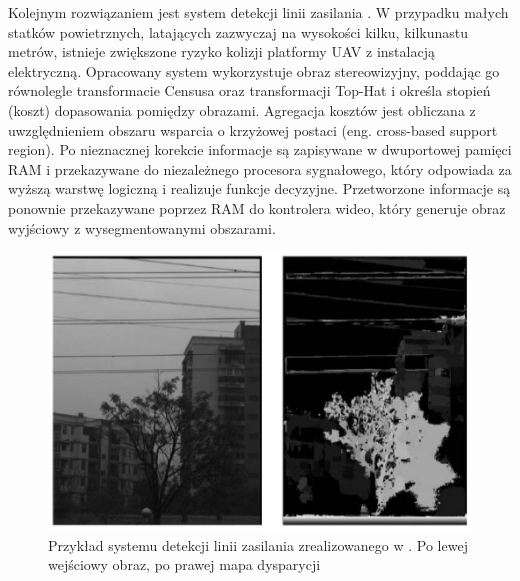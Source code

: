 Kolejnym rozwiązaniem jest system detekcji linii zasilania \cite{STEREOVISION3}. 
W przypadku małych statków powietrznych, latających zazwyczaj na wysokości kilku, kilkunastu metrów, istnieje zwiększone ryzyko kolizji platformy UAV z instalacją elektryczną. 
Opracowany system wykorzystuje obraz stereowizyjny, poddając go równolegle transformacie Censusa oraz transformacji Top-Hat i określa stopień (koszt) dopasowania pomiędzy obrazami. %
Agregacja kosztów jest obliczana z uwzględnieniem obszaru wsparcia o krzyżowej postaci (eng. cross-based support region). %
Po nieznacznej korekcie informacje są zapisywane w dwuportowej pamięci RAM i przekazywane do niezależnego procesora sygnałowego, który odpowiada za wyższą warstwę logiczną i realizuje funkcje decyzyjne.  
Przetworzone informacje są ponownie przekazywane poprzez RAM do kontrolera wideo, który generuje obraz wyjściowy z wysegmentowanymi obszarami.
\begin{figure}[h]
	\centering
	\captionsetup{justification=centering,margin=1cm}
	\includegraphics[width=12cm]{line_detection.png}
	\caption{Przykład systemu detekcji linii zasilania zrealizowanego w \cite{STEREOVISION3}. Po lewej wejściowy obraz, po prawej mapa dysparycji}
	\label{fig:line_detection}
\end{figure}

